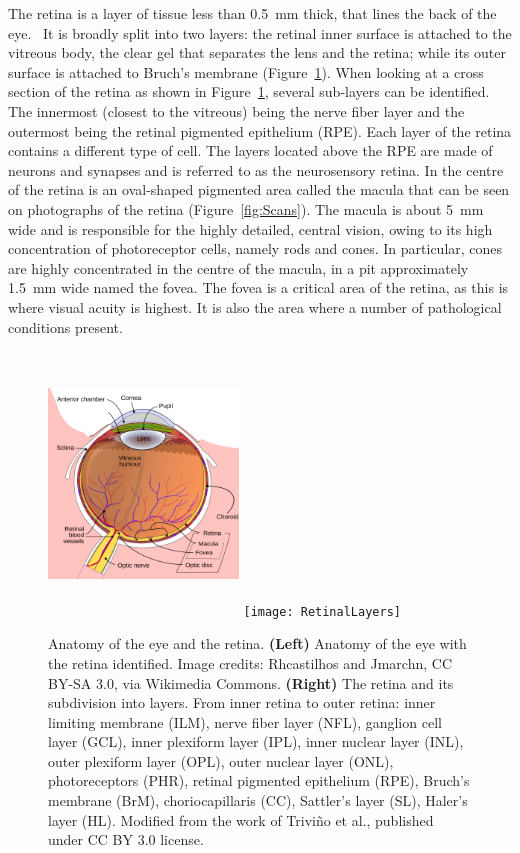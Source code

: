 \documentclass{article}
\begin{document}
The retina is a layer of tissue less than \SI{0.5}{\mm} thick, that lines the back of the eye.~\cite{Gupta_2015}
It is broadly split into two layers: the retinal inner surface is attached to the vitreous body, the clear gel that separates the lens and the retina; while its outer surface is attached to Bruch's membrane (Figure~\ref{fig:architecture-eye}).
When looking at a cross section of the retina as shown in Figure~\ref{fig:architecture-eye}, several sub-layers can be identified. The innermost (closest to the vitreous) being the nerve fiber layer and the outermost being the retinal pigmented epithelium (RPE).
Each layer of the retina contains a different type of cell.
The layers located above the RPE are made of neurons and synapses and is referred to as the neurosensory retina.
In the centre of the retina is an oval-shaped pigmented area called the macula that can be seen on photographs of the retina (Figure~\ref{fig:Scans}).
The macula is about \SI{5}{\mm} wide and is responsible for the highly detailed, central vision, owing to its high concentration of photoreceptor cells, namely rods and cones.
In particular, cones are highly concentrated in the centre of the macula, in a pit approximately \SI{1.5}{\mm} wide named the fovea.
The fovea is a critical area of the retina, as this is where visual acuity is highest.
It is also the area where a number of pathological conditions present.

\begin{figure}[t!]
  \centering
  \includegraphics[width=0.45\textwidth, height=7cm]{ArchitectureEye} %
  \hfill
  \texttt{[image: RetinalLayers]}
  \caption{Anatomy of the eye and the retina. \textbf{(Left)} Anatomy of the eye with the retina identified. Image credits: Rhcastilhos and Jmarchn, CC BY-SA 3.0, via Wikimedia Commons. \textbf{(Right)} The retina and its subdivision into layers. From inner retina to outer retina: inner limiting membrane (ILM), nerve fiber layer (NFL), ganglion cell layer (GCL), inner plexiform layer (IPL), inner nuclear layer (INL), outer plexiform layer (OPL), outer nuclear layer (ONL), photoreceptors (PHR), retinal pigmented epithelium (RPE), Bruch's membrane (BrM), choriocapillaris (CC), Sattler's layer (SL), Haler's layer (HL). Modified from the work of Trivi\~no et al., published under CC BY 3.0 license.~\cite{Trivino_2012}}
  \label{fig:architecture-eye}
\end{figure}
\end{document}

